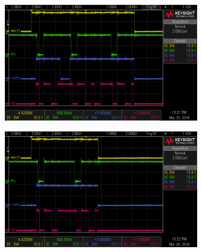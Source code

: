 \documentclass[fleqn]{article}
\begin{document}
\begin{figure}[H]
	\centering
	\includegraphics[width=0.75\textwidth]{img/3b.png}
	\caption{}
\end{figure}

\begin{figure}[H]
	\centering
	\includegraphics[width=0.75\textwidth]{img/3c.png}
	\caption{}
\end{figure}
\end{document}
